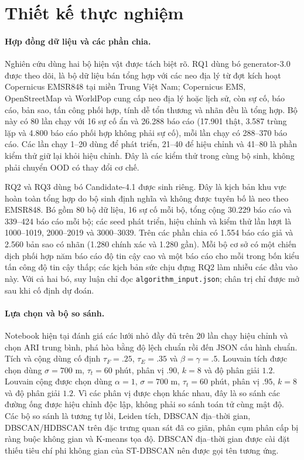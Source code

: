 \documentclass[runningheads]{llncs}
\begin{document}
\FloatBarrier

\section{Thiết kế thực nghiệm}

\paragraph{Hợp đồng dữ liệu và các phần chia.}
Nghiên cứu dùng hai bộ hiện vật được tách biệt rõ. RQ1 dùng bó generator-3.0
được theo dõi, là bộ dữ liệu bán tổng hợp với các neo địa lý từ đợt kích hoạt
Copernicus EMSR848 tại miền Trung Việt Nam; Copernicus EMS, OpenStreetMap
và WorldPop cung cấp neo địa lý hoặc lịch sử, còn sự cố, báo cáo, bản sao,
tấn công phối hợp, tính dễ tổn thương và nhãn đều là tổng hợp. Bộ này có 80
lần chạy với 16 sự cố ẩn và 26.288 báo cáo (17.901 thật, 3.587 trùng lặp và
4.800 báo cáo phối hợp không phải sự cố), mỗi lần chạy có 288--370 báo cáo.
Các lần chạy 1--20 dùng để phát triển, 21--40 để hiệu chỉnh và 41--80 là
phần kiểm thử giữ lại khỏi hiệu chỉnh. Đây là các kiểm thử trong cùng bộ
sinh, không phải chuyển OOD có thay đổi cơ chế.

RQ2 và RQ3 dùng bó Candidate-4.1 được sinh riêng. Đây là kịch bản khu vực
hoàn toàn tổng hợp do bộ sinh định nghĩa và không được tuyên bố là neo theo
EMSR848. Bó gồm 80 bộ dữ liệu, 16 sự cố mỗi bộ, tổng cộng 30.229 báo cáo và
339--424 báo cáo mỗi bộ; các seed phát triển, hiệu chỉnh và kiểm thử lần lượt
là 1000--1019, 2000--2019 và 3000--3039. Trên các phần chia có 1.554 báo
cáo giả và 2.560 bản sao có nhãn (1.280 chính xác và 1.280 gần). Mỗi bộ cơ
sở có một chiến dịch phối hợp năm báo cáo độ tin cậy cao và một báo cáo cho
mỗi trong bốn kiểu tấn công độ tin cậy thấp; các kịch bản sức chịu đựng RQ2
làm nhiễu các đầu vào này. Với cả hai bó, suy luận chỉ đọc
\texttt{algorithm\_input.json}; chân trị chỉ được mở sau khi cố định dự đoán.

\paragraph{Lựa chọn và bộ so sánh.}
Notebook hiện tại đánh giá các lưới nhỏ đầy đủ trên 20 lần chạy hiệu chỉnh
và chọn ARI trung bình, phá hòa bằng độ lệch chuẩn rồi đến JSON cấu hình
chuẩn. Tích và cộng dùng cố định $\tau_F=.25$, $\tau_E=.35$ và
$\beta=\gamma=.5$. Louvain tích được chọn dùng $\sigma=700$ m,
$\tau_t=60$ phút, phân vị $.90$, $k=8$ và độ phân giải $1.2$. Louvain cộng
được chọn dùng $\alpha=1$, $\sigma=700$ m, $\tau_t=60$ phút, phân vị $.95$,
$k=8$ và độ phân giải $1.2$. Vì các phân vị được chọn khác nhau, đây là so
sánh các đường ống được hiệu chỉnh độc lập, không phải so sánh toán tử cùng
mật độ. Các bộ so sánh là tương tự lồi, Leiden tích, DBSCAN địa--thời gian,
DBSCAN/HDBSCAN trên đặc trưng quan sát đã co giãn, phân cụm phân cấp bị ràng
buộc không gian và K-means tọa độ. DBSCAN địa--thời gian được cài đặt thiếu
tiêu chí phi không gian của ST-DBSCAN nên được gọi tên tương ứng.
\end{document}
